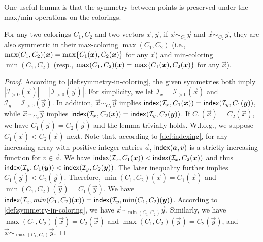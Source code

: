 One useful lemma is that the symmetry between points is preserved under the max/min operations on the colorings. 
\begin{lemma}
    \label{lem:symmetry-preserved-under-max/min}
    For any two colorings $C_1,C_2$ and two vectors $\vec{x}, \vec{y}$, if $\vec{x}\sim_{C_1} \vec{y}$ and $\vec{x}\sim_{C_2}\vec{y}$, they are also symmetric in their max-coloring $\max(C_1,C_2)$ (i.e., $\max(C_1,C_2)(\boldsymbol{x}) = \max\{{C_1(\boldsymbol{x}), C_2(\boldsymbol{x})} \}$ for any $\vec{x}$) and min-coloring $\min(C_1,C_2)$ (resp., $\max(C_1,C_2)(\boldsymbol{x}) = \max\{{C_1(\boldsymbol{x}), C_2(\boldsymbol{x})} \}$ for any $\vec{x}$). 
\end{lemma}
\begin{proof}
    According to \cref{def:symmetry-in-coloring}, the given symmetries both imply $|\mathcal{I}_{>0}(\vec{x})| = |\mathcal{I}_{>0}(\vec{y})|$. 
    For simplicity, we let $\mathcal{I}_x = \mathcal{I}_{>0}(\vec{x})$ and $\mathcal{I}_y = \mathcal{I}_{>0}(\vec{y})$. 
    In addition, $\vec{x}\sim_{C_1} \vec{y}$ implies $\mathsf{index}(\mathcal{I}_{x}, C_1(\boldsymbol{x})) = \mathsf{index}(\mathcal{I}_{y}, C_1(\boldsymbol{y}))$, while $\vec{x}\sim_{C_2} \vec{y}$ implies $\mathsf{index}(\mathcal{I}_{x}, C_2(\boldsymbol{x})) = \mathsf{index}(\mathcal{I}_{y}, C_2(\boldsymbol{y}))$.
    If $C_1(\vec{x})=C_2(\vec{x})$, we have $C_1(\vec{y})=C_2(\vec{y})$ and the lemma trivially holds. 
    W.l.o.g., we suppose $C_1(\vec{x})< C_2(\vec{x})$ next. 
    Note that, according to \cref{def:indexing}, for any increasing array with positive integer entries $\vec{a}$, $\mathsf{index}(\boldsymbol{a}, v)$ is a strictly increasing function for $v\in \vec{a}$. 
    We have $\mathsf{index}(\mathcal{I}_{x}, C_1(\boldsymbol{x}))<\mathsf{index}(\mathcal{I}_{x}, C_2(\boldsymbol{x}))$ and thus $\mathsf{index}(\mathcal{I}_{y}, C_1(\boldsymbol{y}))<\mathsf{index}(\mathcal{I}_{y}, C_2(\boldsymbol{y}))$.
    The later inequality further implies $C_1(\vec{y})<C_2(\vec{y})$. 
    Therefore, $\min(C_1,C_2)(\vec{x})=C_1(\vec{x})$ and $\min(C_1, C_2)(\vec{y})=C_1(\vec{y})$. 
    We have $\mathsf{index}(\mathcal{I}_{x}, min(C_1,C_2)(\boldsymbol{x})) = \mathsf{index}(\mathcal{I}_{y}, \min(C_1,C_2)(\boldsymbol{y}))$.
    According to \cref{def:symmetry-in-coloring}, we have $\vec{x}\sim_{\min(C_1,C_2)} \vec{y}$.
    Similarly, we have $\max(C_1,C_2)(\vec{x})=C_2(\vec{x})$ and $\max(C_1, C_2)(\vec{y})=C_2(\vec{y})$, and $\vec{x}\sim_{\max(C_1,C_2)} \vec{y}$.
\end{proof}



